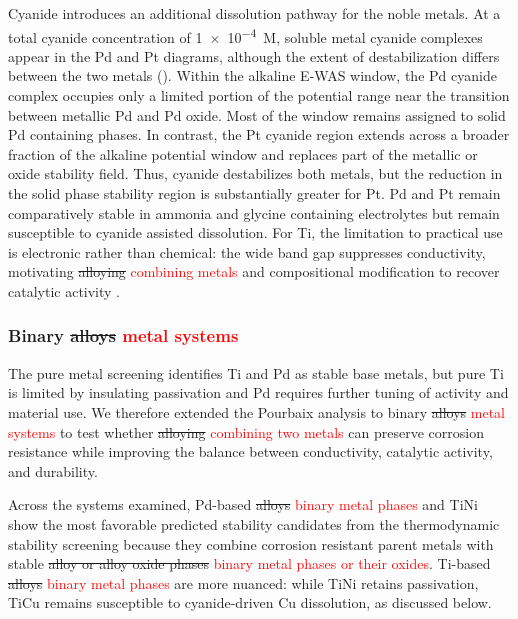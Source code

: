 \documentclass[twoside,twocolumn,9pt]{article}
\begin{document}
Cyanide introduces an additional dissolution pathway for the noble metals. At a total cyanide concentration of \SI{1e-4}{M}, soluble metal cyanide complexes appear in the Pd and Pt diagrams, although the extent of destabilization differs between the two metals (). Within the alkaline E-WAS window, the Pd cyanide complex occupies only a limited portion of the potential range near the transition between metallic Pd and Pd oxide. Most of the window remains assigned to solid Pd containing phases. In contrast, the Pt cyanide region extends across a broader fraction of the alkaline potential window and replaces part of the metallic or oxide stability field. Thus, cyanide destabilizes both metals, but the reduction in the solid phase stability region is substantially greater for Pt. Pd and Pt remain comparatively stable in ammonia and glycine containing electrolytes but remain susceptible to cyanide assisted dissolution. For Ti, the limitation to practical use is electronic rather than chemical: the wide  band gap suppresses conductivity, motivating \sout{alloying} \textcolor{red}{combining metals} and compositional modification to recover catalytic activity \cite{Gardon2013ImprovedSpray,Hui2022VacancyBatteries}.

\subsubsection{Binary \sout{alloys} \textcolor{red}{metal systems}} \label{sec:alloy_screening}

The pure metal screening identifies Ti and Pd as stable base metals, but pure Ti is limited by insulating  passivation and Pd requires further tuning of activity and material use. We therefore extended the Pourbaix analysis to binary \sout{alloys} \textcolor{red}{metal systems} to test whether \sout{alloying} \textcolor{red}{combining two metals} can preserve corrosion resistance while improving the balance between conductivity, catalytic activity, and durability.

Across the systems examined, Pd-based \sout{alloys} \textcolor{red}{binary metal phases} and TiNi show the most favorable predicted stability candidates from the thermodynamic stability screening because they combine corrosion resistant parent metals with stable \sout{alloy or alloy oxide phases} \textcolor{red}{binary metal phases or their oxides}. Ti-based \sout{alloys} \textcolor{red}{binary metal phases} are more nuanced: while TiNi retains passivation, TiCu remains susceptible to cyanide-driven Cu dissolution, as discussed below.
\end{document}
